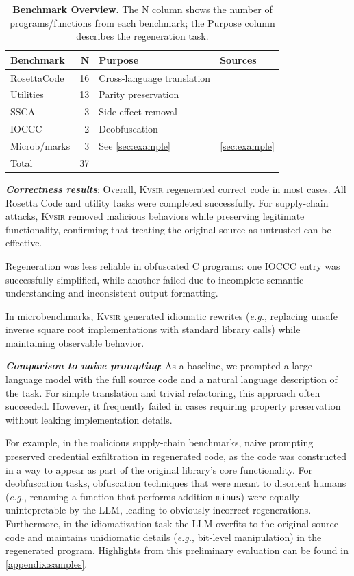 \documentclass[sigplan,review,anonymous,10pt]{acmart}
\def\eg{{\em e.g.}, }
\newcommand{\sys}{{\scshape Kv{\textalpha}sir}\xspace}
\newcommand{\heading}[1]{\vspace{2pt}\noindent\textbf{\emph{#1}}:\enspace}
\newcommand{\ttt}[1]{\texttt{#1}\xspace}
\begin{document}
\begin{table}[t]
\centering
\caption{\textbf{Benchmark Overview}. 
The N column shows the number of programs/functions from each benchmark;
the Purpose column describes the regeneration task.}
\begin{tabular}{lrll}
\toprule
Benchmark   & N  & Purpose                    & Sources \\
\midrule
RosettaCode & 16 & Cross-language translation & \cite{rosettacode} \\
Utilities   & 13 & Parity preservation        & \cite{regbench2025} \\
SSCA        & 3  & Side-effect removal & \cite{ohm2020backstabber,ev:eurosec:2022} \\
IOCCC       & 2  & Deobfuscation              & \cite{ioccc} \\
Microb/marks & 3 & See \cref{sec:example} & \cref{sec:example} \\
\midrule
  Total     & 37 &                           & \\
\bottomrule
\end{tabular}
\label{tab:benchmarks}
\end{table}

\heading{Correctness results}
Overall, \sys regenerated correct code in most cases. All Rosetta Code and
utility tasks were completed successfully. For supply-chain attacks, \sys
removed malicious behaviors while preserving legitimate functionality,
confirming that treating the original source as untrusted can be effective. 

Regeneration was less reliable in obfuscated C programs: one IOCCC entry was
successfully simplified, while another failed due to incomplete semantic
understanding and inconsistent output formatting.

In microbenchmarks, \sys generated idiomatic rewrites (\eg replacing unsafe
inverse square root implementations with standard library calls) while
maintaining observable behavior.

\heading{Comparison to naive prompting}
As a baseline, we prompted a large language model with the full source code and
a natural language description of the task. For simple translation and trivial
refactoring, this approach often succeeded. However, it frequently failed in
cases requiring property preservation without leaking implementation details. 

For example, in the malicious supply-chain benchmarks, naive prompting
preserved credential exfiltration in regenerated code, as the code 
was constructed in a way to appear as part of the original library's core functionality.
For deobfuscation tasks, obfuscation techniques that were meant to disorient 
humans (\eg renaming a function that performs addition \ttt{minus})
were equally unintepretable by the LLM, leading to obviously incorrect regenerations.
Furthermore, in the idiomatization task the LLM overfits 
to the original source code and maintains unidiomatic details (\eg bit-level manipulation)
in the regenerated program.
Highlights from this preliminary evaluation can be found in \cref{appendix:samples}.
\end{document}
